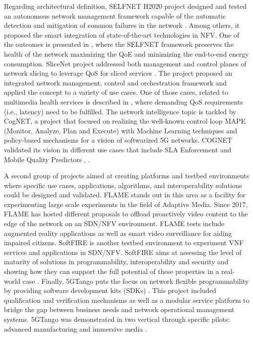 Regarding architectural definition, SELFNET H2020 project designed and tested an autonomous network management framework capable of the automatic detection and mitigation of common failures in the network \cite{celdran_enabling_2017}. Among others, it proposed the smart integration of state-of-the-art technologies in NFV. One of the outcomes is presented in \cite{Nightingale2016}, where the SELFNET framework preserves the health of the network maximizing the QoE and minimizing the end-to-end energy consumption. SliceNet project addressed both management and control planes of network slicing to leverage QoS for sliced services \cite{chang_slice_2018}. The project proposed an integrated network management, control and orchestration framework and applied the concept to a variety of use cases. One of those cases, related to multimedia health services is described in \cite{wang_enable_2019}, where demanding QoS requirements (i.e., latency) need to be fulfilled. The network intelligence topic is tackled by CogNET, a project that focused on realizing the well-known control loop MAPE (Monitor, Analyze, Plan and Execute) with Machine Learning techniques and policy-based mechanisms for a vision of softwarized 5G networks. COGNET validated its vision in different use cases that include SLA Enforcement and Mobile Quality Predictors \cite{assem_machine_2016}, \cite{ben_yahia_cognitive_2017}. 

A second group of projects aimed at creating platforms and testbed environments where specific use cases, applications, algorithms, and interoperability solutions could be designed and validated. FLAME stands out in this area as a facility for experimenting large scale experiments in the field of Adaptive Media. Since 2017, FLAME has hosted different proposals \cite{haensge_cloud-native_2019} to offload proactively video content to the edge of the network on an SDN/NFV environment. FLAME tests include augmented reality applications as well as smart video surveillance for aiding impaired citizens. SoftFIRE is another testbed environment to experiment VNF services and applications in SDN/NFV. SoftFIRE aims at assessing the level of maturity of solutions in programmability, interoperability and security and showing how they can support the full potential of these properties in a real-world case \cite{lake_virtualising_2017}. Finally, 5GTango puts the focus on network flexible programmability \cite{peuster_introducing_2019} by providing software development kits (SDKs) \cite{soenen_empowering_2019}. This project included qualification and verification mechanisms as well as a modular service platform to bridge the gap between business needs and network operational management systems. 5GTango was demonstrated in two vertical through specific pilots: advanced manufacturing and immersive media \cite{peuster_introducing_2019}.

